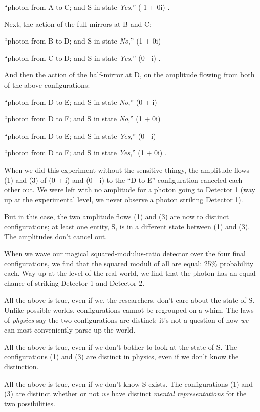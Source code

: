 {
 ``photon from A to C; and S in state
\textit{Yes},'' (-1 + 0i) .}

{
 Next, the action of the full mirrors at B and C:}

{
 ``photon from B to D; and S in state
\textit{No},'' (1 + 0i)}

{
 ``photon from C to D; and S in state
\textit{Yes},'' (0 - i) .}

{
 And then the action of the half-mirror at D, on the amplitude
flowing from both of the above configurations:}

{
 ``photon from D to E; and S in state
\textit{No},'' (0 + i)}

{
 ``photon from D to F; and S in state
\textit{No},'' (1 + 0i)}

{
 ``photon from D to E; and S in state
\textit{Yes},'' (0 - i)}

{
 ``photon from D to F; and S in state
\textit{Yes},'' (1 + 0i) .}

{
 When we did this experiment without the sensitive thingy, the
amplitude flows (1) and (3) of (0 + i) and (0 - i) to the
``D to E'' configuration canceled
each other out. We were left with no amplitude for a photon going to
Detector 1 (way up at the experimental level, we never observe a photon
striking Detector 1).}

{
 But in this case, the two amplitude flows (1) and (3) are now to
distinct configurations; at least one entity, S, is in a different
state between (1) and (3). The amplitudes don't cancel
out.}

{
 When we wave our magical squared-modulus-ratio detector over the
four final configurations, we find that the squared moduli of all are
equal: 25\% probability each. Way up at the level of the real world, we
find that the photon has an equal chance of striking Detector 1 and
Detector 2.}

{
 All the above is true, even if we, the researchers,
don't care about the state of S. Unlike possible
worlds, configurations cannot be regrouped on a whim. The laws of
\textit{physics} say the two configurations are distinct;
it's not a question of how \textit{we} can most
conveniently parse up the world.}

{
 All the above is true, even if we don't bother to
look at the state of S. The configurations (1) and (3) are distinct in
physics, even if we don't know the distinction.}

{
 All the above is true, even if we don't know S
exists. The configurations (1) and (3) are distinct whether or not
\textit{we} have distinct \textit{mental representations} for the two
possibilities.}

